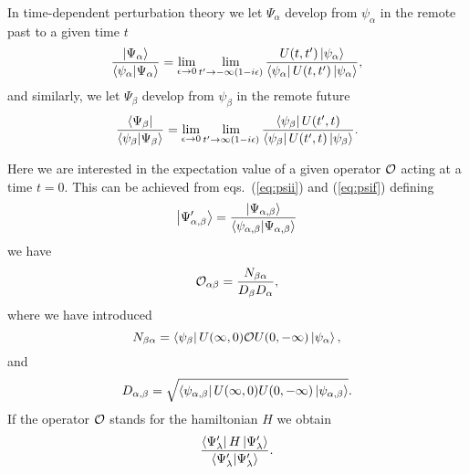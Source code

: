In time-dependent
perturbation theory we let $\Psi_{\alpha}$ develop from $\psi_{\alpha}$ in the
remote past to a given time $t$
\begin{equation}
    \frac{\left| \Psi_{\alpha} \right\rangle}
    {\left\langle\psi_{\alpha} | \Psi_{\alpha} \right\rangle}=
    \lim_{\epsilon \rightarrow 0}
   \lim_{t'\rightarrow -\infty (1-i\epsilon )}
   \frac{U(t,t' )\left| \psi_{\alpha} \right\rangle }
   { \left\langle \psi_{\alpha} \right| U(t,t' )\left| \psi_{\alpha} \right\rangle },
   \label{eq:psii}
\end{equation}
and similarly, we let
$\Psi_{\beta}$ develop from $\psi_{\beta}$ in the remote future
\begin{equation}
    \frac{\left\langle \Psi_{\beta} \right|}{\left\langle
    \psi_{\beta} | \Psi_{\beta} \right\rangle}=
    \lim_{\epsilon \rightarrow 0}
    \lim_{t'\rightarrow \infty (1-i\epsilon )}
    \frac{\left\langle \psi_{\beta} \right|U(t' ,t) }
    { \left\langle \psi_{\beta} \right| U(t' ,t)\left| \psi_{\beta} \right\rangle }.
    \label{eq:psif}
\end{equation}

Here we are interested in the expectation value of a given
operator ${\cal O}$ acting at a time $t=0$. This can be achieved
from eqs.\ (\ref{eq:psii}) and (\ref{eq:psif}) defining
\begin{equation}
     \left| \Psi_{\alpha ,\beta}' \right\rangle=
     \frac{\left| \Psi_{\alpha ,\beta} \right\rangle}
     {\left\langle\psi_{\alpha ,\beta} | \Psi_{\alpha ,\beta} \right\rangle}
\end{equation}
we have
\begin{equation}
   {\cal O}_{\alpha\beta}
  =\frac{N_{\beta\alpha}}{D_{\beta}D_{\alpha}},
   \label{eq:expect}
\end{equation}
where we have introduced
\begin{equation}
   N_{\beta\alpha}=
   \left\langle \psi_{\beta} \right|U(\infty ,0){\cal O}U(0,-\infty )\left| \psi_{\alpha} \right\rangle ,
\end{equation}
and 
\begin{equation}
   D_{\alpha ,\beta}=
   \sqrt{\left\langle \psi_{\alpha ,\beta} \right|
   U(\infty ,0)U(0,-\infty )\left| \psi_{\alpha ,\beta} \right\rangle}. 
\end{equation}
If the operator ${\cal O}$ stands for the hamiltonian $H$ we obtain
\begin{equation}
    {\displaystyle  \frac{\left\langle \Psi_{\lambda}' \right|H\left| \Psi_{\lambda}' \right\rangle }
   { \left\langle\Psi_{\lambda}' | \Psi_{\lambda}' \right\rangle} }
   \label{eq:hexpect}.
\end{equation}

